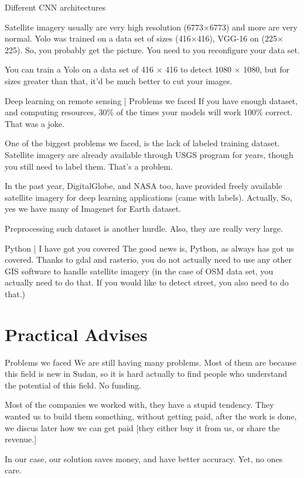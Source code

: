 \documentclass{beamer}
\begin{document}
\begin{frame}{Different CNN architectures}

  Satellite imagery usually are very high resolution (6773$\times$6773) and more are
  very normal. Yolo was trained on a data set of sizes (416$\times$416), VGG-16
  on (225$\times$225). So, you probably get the picture. You need to you
  reconfigure your data set.

  You can train a Yolo on a data set of 416 $\times$ 416 to detect 1080 $\times$
  1080, but for sizes greater than that, it'd be much better to cut your images.  
\end{frame}

\begin{frame}{Deep learning on remote sensing | Problems we faced}
  If you have enough dataset, and computing resources, 30\% of the times your
  models will work 100\% correct. \alert{That was a joke.}

  One of the biggest problems we faced, is the lack of labeled training dataset.
  Satellite imagery are already available through USGS program for years, though
  you still need to label them. That's a problem.

  In the past year, DigitalGlobe, and NASA too, have provided freely available
  satellite imagery for deep learning applications (came with labels). Actually,
  So, yes we have many of Imagenet for Earth dataset.

  Preprocessing such dataset is another hurdle. Also, they are really very large.
\end{frame}

\begin{frame}{Python | I have got you covered}
  The good news is, Python, as always has got us covered. Thanks to gdal and
  rasterio, you do not actually need to use any other GIS software to handle
  satellite imagery (in the case of OSM data set, you actually need to do that.
  If you would like to detect street, you also need to do that.)
\end{frame}

\section{Practical Advises}

\begin{frame}{Problems we faced}
  We are still having many problems. Most of them are because this field is new
  in Sudan, so it is hard actually to find people who understand the potential
  of this field. No funding.

  Most of the companies we worked with, they have a stupid tendency. They wanted
  us to build them something, without getting paid, after the work is done, we
  discus later how we can get paid [they either buy it from us, or share the revenue.]

  In our case, our solution saves money, and have better accuracy. Yet, no ones care.
\end{frame}
\end{document}
